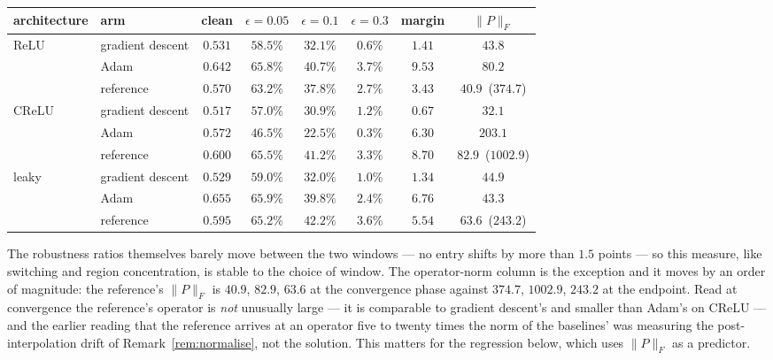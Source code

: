 \documentclass{article} %
\theoremstyle{plain}
\theoremstyle{definition}
\theoremstyle{remark}
\begin{document}
\begin{center}\small
\begin{tabular}{llcccccc}
\toprule
architecture & arm & clean & $\epsilon{=}0.05$ & $\epsilon{=}0.1$ & $\epsilon{=}0.3$ & margin & $\|P\|_F$ \\
\midrule
ReLU  & gradient descent & $0.531$ & $58.5\%$ & $32.1\%$ & $0.6\%$ & $1.41$ & $43.8$ \\
      & Adam             & $0.642$ & $\mathbf{65.8\%}$ & $\mathbf{40.7\%}$ & $\mathbf{3.7\%}$ & $9.53$ & $80.2$ \\
      & reference        & $0.570$ & $63.2\%$ & $37.8\%$ & $2.7\%$ & $3.43$ & $40.9$ \,($374.7$) \\
\midrule
CReLU & gradient descent & $0.517$ & $57.0\%$ & $30.9\%$ & $1.2\%$ & $0.67$ & $32.1$ \\
      & Adam             & $0.572$ & $46.5\%$ & $22.5\%$ & $0.3\%$ & $6.30$ & $203.1$ \\
      & reference        & $0.600$ & $\mathbf{65.5\%}$ & $\mathbf{41.2\%}$ & $\mathbf{3.3\%}$ & $8.70$ & $82.9$ \,($1002.9$) \\
\midrule
leaky & gradient descent & $0.529$ & $59.0\%$ & $32.0\%$ & $1.0\%$ & $1.34$ & $44.9$ \\
      & Adam             & $0.655$ & $\mathbf{65.9\%}$ & $39.8\%$ & $2.4\%$ & $6.76$ & $43.3$ \\
      & reference        & $0.595$ & $65.2\%$ & $\mathbf{42.2\%}$ & $\mathbf{3.6\%}$ & $5.54$ & $63.6$ \,($243.2$) \\
\bottomrule
\end{tabular}
\end{center}

\noindent The robustness ratios themselves barely move between the two windows --- no entry shifts
by more than $1.5$ points --- so this measure, like switching and region concentration, is stable
to the choice of window. The operator-norm column is the exception and it moves by an order of
magnitude: the reference's $\|P\|_F$ is $40.9$, $82.9$, $63.6$ at the convergence phase against
$374.7$, $1002.9$, $243.2$ at the endpoint. Read at convergence the reference's operator is
\emph{not} unusually large --- it is comparable to gradient descent's and smaller than Adam's on
CReLU --- and the earlier reading that the reference arrives at an operator five to twenty times
the norm of the baselines' was measuring the post-interpolation drift of
Remark~\ref{rem:normalise}, not the solution. This matters for the regression below, which uses
$\|P\|_F$ as a predictor.
\end{document}
